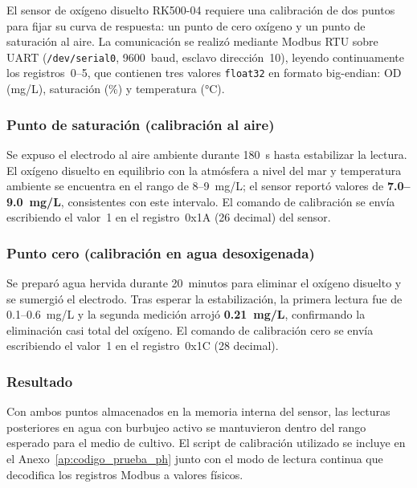 El sensor de oxígeno disuelto RK500-04 requiere una calibración de dos puntos
para fijar su curva de respuesta: un punto de cero oxígeno y un punto de
saturación al aire. La comunicación se realizó mediante Modbus RTU sobre
UART (\texttt{/dev/serial0}, 9600~baud, esclavo dirección~10), leyendo
continuamente los registros~0--5, que contienen tres valores \texttt{float32}
en formato big-endian: OD (mg/L), saturación (\%) y temperatura (°C).

\subsubsection*{Punto de saturación (calibración al aire)}

Se expuso el electrodo al aire ambiente durante 180~s hasta estabilizar la
lectura. El oxígeno disuelto en equilibrio con la atmósfera a nivel del mar y
temperatura ambiente se encuentra en el rango de 8--9~mg/L; el sensor reportó
valores de \textbf{7.0--9.0~mg/L}, consistentes con este intervalo. El comando
de calibración se envía escribiendo el valor~1 en el registro~0x1A (26 decimal)
del sensor.

\subsubsection*{Punto cero (calibración en agua desoxigenada)}

Se preparó agua hervida durante 20~minutos para eliminar el oxígeno disuelto
y se sumergió el electrodo. Tras esperar la estabilización, la primera lectura
fue de 0.1--0.6~mg/L y la segunda medición arrojó \textbf{0.21~mg/L},
confirmando la eliminación casi total del oxígeno. El comando de calibración
cero se envía escribiendo el valor~1 en el registro~0x1C (28 decimal).

\subsubsection*{Resultado}

Con ambos puntos almacenados en la memoria interna del sensor, las lecturas
posteriores en agua con burbujeo activo se mantuvieron dentro del rango
esperado para el medio de cultivo. El script de calibración utilizado se
incluye en el Anexo~\ref{ap:codigo_prueba_ph} junto con el modo de lectura
continua que decodifica los registros Modbus a valores físicos.
